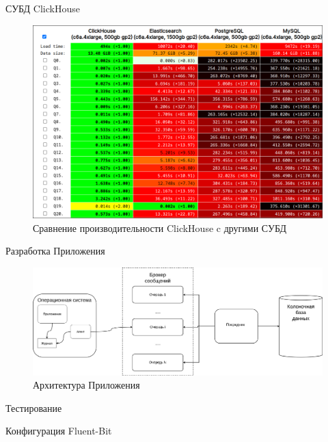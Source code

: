 \documentclass{beamer}
\begin{document}
\begin{frame}{СУБД ClickHouse}
	\begin{itemize}
	\end{itemize}
	\begin{figure}[H]
		\centering
		\begin{minipage}[t]{.9\textwidth}
			\centering
			\includegraphics[width=.7\textwidth]{./imgs/clickbench.png}
		\end{minipage}
		\caption{Сравнение производительности ClickHouse c другими СУБД}
	\end{figure}
\end{frame}

\begin{frame}{Разработка Приложения}
	\begin{figure}[H]
		\centering
		\begin{minipage}[t]{1.2\textwidth}
			\centering
			\includegraphics[width=.7\textwidth]{./imgs/appscheme.png}
		\end{minipage}
		\caption{Архитектура Приложения}
	\end{figure}
\end{frame}

\begin{frame}{Тестирование}
	\begin{listing}[H]
		\caption{Конфигурация Fluent-Bit}
		\label{lst:fluentbitconf}
		\inputminted[style=bw, frame=single,fontsize = \footnotesize, linenos=false, xleftmargin = 1.5em]{sql}{./listings/fluent-bit.conf}
	\end{listing}
\end{frame}
\end{document}
